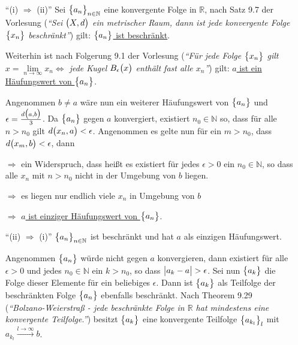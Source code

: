 \documentclass{scrreprt}
\begin{document}
\begin{itemize}
\item[``(i) $\Rightarrow$ (ii)''] Sei $\qty\big{a_n}_{n \in \mathbb{N}}$ eine
  konvergente Folge in $\mathbb{R}$, nach Satz 9.7 der Vorlesung
  (\emph{``Sei $\qty\big(X, d)$ ein metrischer Raum, dann ist jede konvergente
    Folge $\qty\big{x_n}$ beschränkt''}) gilt:
  \underline{$\qty\big{a_n}$ ist beschränkt}.

  Weiterhin ist nach Folgerung 9.1 der Vorlesung (\emph{``Für jede Folge
    $\qty\big{x_n}$ gilt $x = \underset{n \to \infty}\lim x_n \iff$ jede Kugel
    $B_{\epsilon}\qty\big(x)$ enthält fast alle $x_n$''}) gilt:
  \underline{$a$ ist ein Häufungswert von $\qty\big{a_n}$}.

  Angenommen $b \ne a$ wäre nun ein weiterer Häufungswert von $\qty\big{a_n}$
  und $\epsilon = \frac{d\qty\big(a, b)}{3}$.
  Da $\qty\big{a_n}$ gegen $a$ konvergiert, existiert $n_0 \in \mathbb{N}$
  so, dass für alle $n > n_0$ gilt $d\qty\big(x_n, a) < \epsilon$.
  Angenommen es gelte nun für ein $m > n_0$, dass
  $d\qty\big(x_m, b) < \epsilon$, dann
  $\Rightarrow$ ein Widerspruch, dass heißt es existiert für jedes
  $\epsilon > 0$ ein $n_0 \in \mathbb{N}$, so dass alle $x_n$ mit $n > n_0$
  nicht in der Umgebung von $b$ liegen.

  $\Rightarrow$ es liegen nur endlich viele $x_n$ in Umgebung von $b$

  $\Rightarrow$ \underline{$a$ ist einziger Häufungswert von $\qty\big{a_n}$}.

\item[``(ii) $\Rightarrow$ (i)''] $\qty\big{a_n}_{n \in \mathbb{N}}$ ist
  beschränkt und hat $a$ als einzigen Häufungswert.

  Angenommen $\qty\big{a_n}$ würde nicht gegen $a$ konvergieren, dann existiert
  für alle $\epsilon > 0$ und jedes $n_0 \in \mathbb{N}$ ein $k > n_0$, so dass
  $\abs\big{a_k - a } > \epsilon$.
  Sei nun $\qty\big{a_k}$ die Folge dieser Elemente für ein beliebiges
  $\epsilon$.
  Dann ist $\qty\big{a_k}$ als Teilfolge der beschränkten Folge $\qty\big{a_n}$
  ebenfalls beschränkt.
  Nach Theorem 9.29 (\emph{``Bolzano-Weierstraß  - jede beschränkte Folge in
    $\mathbb{R}$ hat mindestens eine konvergente Teilfolge.''}) besitzt
  $\qty\big{a_k}$ eine konvergente Teilfolge $\qty\big{a_{k_l}}_l$ mit
  $a_{k_l} \overset{l \to \infty}\longrightarrow b$.


\end{itemize}
\end{document}
